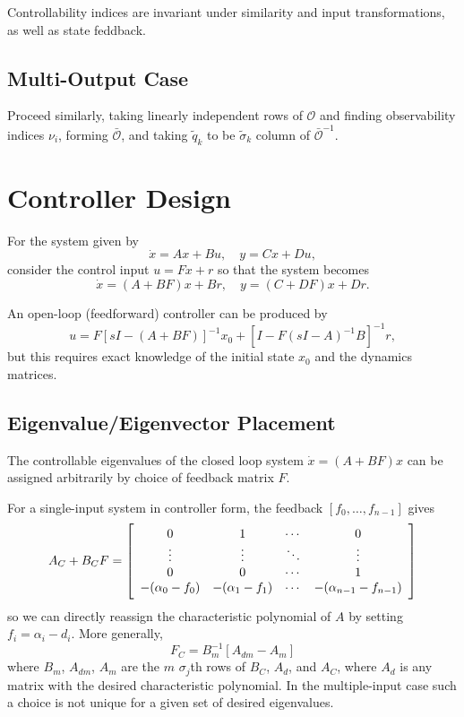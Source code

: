 \documentclass{article}
\begin{document}
Controllability indices are invariant under similarity and input
transformations, as well as state feddback.

\subsection{Multi-Output Case}
Proceed similarly, taking linearly independent rows of $\mathcal{O}$
and finding observability indices $\nu_i$, forming $\bar{\mathcal{O}}$,
and taking $\tilde{q}_k$ to be
$\tilde{\sigma}_k$ column of $\bar{\mathcal{O}}^{-1}$.

\section{Controller Design}
For the system given by
$$
\dot{x} = Ax + Bu, \quad
y = Cx + Du,
$$
consider the control input $u = Fx + r$
so that the system becomes
$$
\dot{x} = (A + BF)x + Br, \quad
y = (C + DF) x + Dr.
$$

An open-loop (feedforward) controller can be produced by
$$
u = F[sI - (A + BF)]^{-1} x_0 + [I - F(sI - A)^{-1} B]^{-1} r,
$$
but this requires exact knowledge of the initial state $x_0$ and the
dynamics matrices.

\subsection{Eigenvalue/Eigenvector Placement}
The controllable eigenvalues of the closed loop system
$\dot{x} = (A + BF)x$ can be assigned arbitrarily by choice of
feedback matrix $F$.

For a single-input system in controller form, the feedback
$[f_0, \dots, f_{n-1}]$ gives
$$
A_C + B_C F =
\left[\begin{array}{c c c c}
   0                & 1                 & \cdots & 0      \\
   \vdots           & \vdots            & \ddots & \vdots \\
   0                & 0                 & \cdots & 1      \\
  -(\alpha_0 - f_0) &  -(\alpha_1 - f_1) & \cdots & -(\alpha_{n-1} - f_{n-1})
\end{array}\right]
$$
so we can directly reassign the characteristic polynomial of $A$ by
setting $f_i = \alpha_i - d_i$. More generally,
$$
F_C = B_m^{-1} [ A_{dm} - A_m ]
$$
where $B_m$, $A_{dm}$, $A_m$ are the $m$ $\sigma_j$th rows of $B_C$,
$A_d$, and $A_C$, where $A_d$ is any matrix with the desired
characteristic polynomial. In the multiple-input case such a choice is
not unique for a given set of desired eigenvalues.
\end{document}
